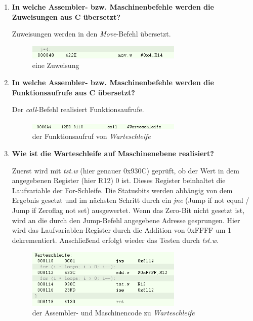\documentclass[12pt,a4paper,bibliography=totocnumbered,listof=totocnumbered]{scrartcl}
\begin{document}
\begin{enumerate}
	\item \textbf{In welche Assembler- bzw. Maschinenbefehle werden die Zuweisungen aus C übersetzt?}
	
	Zuweisungen werden in den \textit{Move}-Befehl übersetzt.
	
		\begin{figure}[!ht]
			\centering
			\includegraphics[width=0.7\textwidth]{img/MoveBefehl.png}
			\caption{eine Zuweisung}
		\end{figure}
	
	\item \textbf{In welche Assembler- bzw. Maschinenbefehle werden die Funktionsaufrufe aus C übersetzt?}
	
	Der \textit{call}-Befehl realisiert Funktionsaufrufe.
	
	\begin{figure}[!ht]
		\centering
		\includegraphics[width=0.7\textwidth]{img/CallBefehl.png}
		\caption{der Funktionsaufruf von \textit{Warteschleife}}
	\end{figure}
	
	\item \textbf{Wie ist die Warteschleife auf Maschinenebene realisiert?}
	
	Zuerst wird mit \textit{tst.w} (hier genauer 0x930C) geprüft, ob der Wert in dem angegebenen Register (hier R12) 0 ist. Dieses Register beinhaltet die Laufvariable der For-Schleife. Die Statusbits werden abhängig von dem Ergebnis gesetzt und im nächsten Schritt durch ein \textit{jne} (Jump if not equal / Jump if Zeroflag not set) ausgewertet. Wenn das Zero-Bit nicht gesetzt ist, wird an die durch den Jump-Befehl angegebene Adresse gesprungen. Hier wird das Laufvariablen-Register durch die Addition von 0xFFFF um 1 dekrementiert. Anschließend erfolgt wieder das Testen durch \textit{tst.w}. 
		
	\begin{figure}[!htb]
		\centering
		\includegraphics[width=0.7\textwidth]{img/Warteschleife.png}
		\caption{der Assembler- und Maschinencode zu \textit{Warteschleife}}
	\end{figure}
	\FloatBarrier


\end{enumerate}
\end{document}
